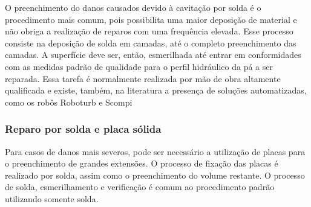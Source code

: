 O preenchimento do danos causados devido à cavitação por solda é o procedimento
mais comum, pois possibilita uma maior deposição de material e não obriga a
realização de reparos com uma frequência elevada. Esse processo consiste na
deposição de solda em camadas, até o completo preenchimento das camadas. A
superfície deve ser, então, esmerilhada até entrar em conformidades com as
medidas padrão de qualidade para o perfil hidráulico da pá a ser reparada. Essa tarefa
é normalmente realizada por mão de obra altamente qualificada e existe, também,
na literatura a presença de soluções automatizadas, como os robôs Roboturb e Scompi
\citep{roboturb,scompi}

\subsubsection{Reparo por solda e placa sólida}

Para casos de danos mais severos, pode ser necessário a utilização de placas
para o preenchimento de grandes extensões. O processo de fixação das placas é
realizado por solda, assim como o preenchimento do volume restante. O processo
de solda, esmerilhamento e verificação é comum ao procedimento padrão utilizando
somente solda.














